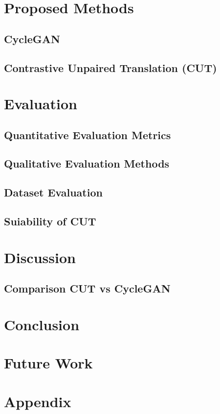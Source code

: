 \documentclass[a4paper,11pt, DIV=12]{scrartcl}
\begin{document}
\section{Proposed Methods}

\subsection{CycleGAN}
\subsection{Contrastive Unpaired Translation (CUT)}

\section{Evaluation}
\subsection{Quantitative Evaluation Metrics}
\subsection{Qualitative Evaluation Methods}
\subsection{Dataset Evaluation}
\subsection{Suiability of CUT}

\section{Discussion}
\subsection{Comparison CUT vs CycleGAN}

\section{Conclusion}
\section{Future Work}
\section{Appendix}

\printbibliography
\end{document}
